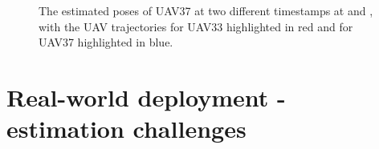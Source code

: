 \begin{figure}[H]
    \centering
    \caption{
        The estimated poses of UAV37 at two different timestamps at  and , with the \ac{UAV} trajectories for UAV33 highlighted in red and for UAV37 highlighted in blue.
    }
\label{fig:3dp}
\end{figure}

\section{Real-world deployment - estimation challenges}

